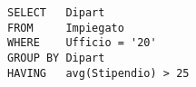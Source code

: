 \begin{lstlisting}
SELECT   Dipart
FROM     Impiegato
WHERE    Ufficio = '20'
GROUP BY Dipart
HAVING   avg(Stipendio) > 25
\end{lstlisting}
